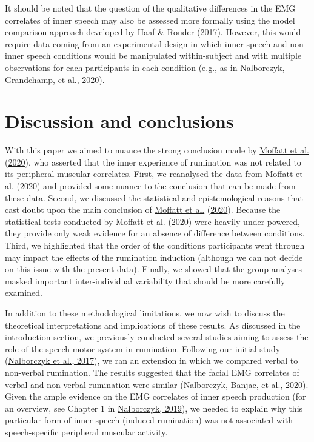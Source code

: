 \documentclass[
  english,
  man, donotrepeattitle,floatsintext]{apa6}
\begin{document}
It should be noted that the question of the qualitative differences in the EMG correlates of inner speech may also be assessed more formally using the model comparison approach developed by \protect\hyperlink{ref-haaf_developing_2017}{Haaf \& Rouder} (\protect\hyperlink{ref-haaf_developing_2017}{2017}). However, this would require data coming from an experimental design in which inner speech and non-inner speech conditions would be manipulated within-subject and with multiple observations for each participants in each condition (e.g., as in \protect\hyperlink{ref-nalborczyk_can_2020}{Nalborczyk, Grandchamp, et al., 2020}).

\hypertarget{discussion-and-conclusions}{%
\section{Discussion and conclusions}\label{discussion-and-conclusions}}

With this paper we aimed to nuance the strong conclusion made by \protect\hyperlink{ref-moffatt_inner_2020}{Moffatt et al.} (\protect\hyperlink{ref-moffatt_inner_2020}{2020}), who asserted that the inner experience of rumination was not related to its peripheral muscular correlates. First, we reanalysed the data from \protect\hyperlink{ref-moffatt_inner_2020}{Moffatt et al.} (\protect\hyperlink{ref-moffatt_inner_2020}{2020}) and provided some nuance to the conclusion that can be made from these data. Second, we discussed the statistical and epistemological reasons that cast doubt upon the main conclusion of \protect\hyperlink{ref-moffatt_inner_2020}{Moffatt et al.} (\protect\hyperlink{ref-moffatt_inner_2020}{2020}). Because the statistical tests conducted by \protect\hyperlink{ref-moffatt_inner_2020}{Moffatt et al.} (\protect\hyperlink{ref-moffatt_inner_2020}{2020}) were heavily under-powered, they provide only weak evidence for an absence of difference between conditions. Third, we highlighted that the order of the conditions participants went through may impact the effects of the rumination induction (although we can not decide on this issue with the present data). Finally, we showed that the group analyses masked important inter-individual variability that should be more carefully examined.

In addition to these methodological limitations, we now wish to discuss the theoretical interpretations and implications of these results. As discussed in the introduction section, we previously conducted several studies aiming to assess the role of the speech motor system in rumination. Following our initial study (\protect\hyperlink{ref-nalborczyk_orofacial_2017}{Nalborczyk et al., 2017}), we ran an extension in which we compared verbal to non-verbal rumination. The results suggested that the facial EMG correlates of verbal and non-verbal rumination were similar (\protect\hyperlink{ref-nalborczyk_dissociating_2020}{Nalborczyk, Banjac, et al., 2020}). Given the ample evidence on the EMG correlates of inner speech production (for an overview, see Chapter 1 in \protect\hyperlink{ref-nalborczyk_understanding_2019}{Nalborczyk, 2019}), we needed to explain why this particular form of inner speech (induced rumination) was not associated with speech-specific peripheral muscular activity.
\end{document}
